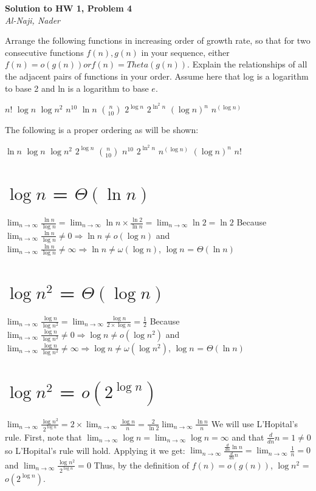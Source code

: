 \documentclass[12pt]{article}
\newcommand{\myhwtitle}[3]
{\begin{center}
{\large {\bf Solution to HW {#1}, Problem {#2}}}\\
\medskip 
{\it {#3}} %
\end{center}}
\begin{document}
\newpage
\myhwtitle{1}{4}{Al-Naji, Nader}

\bigskip

Arrange the following functions in increasing order of growth rate, so that for two consecutive functions $f(n), g(n)$ in your sequence, either $f(n) = o(g(n)) or f(n) = Theta(g(n)).$
Explain the relationships of all the adjacent pairs of functions in your order. Assume here that log is a logarithm to base 2 and ln is a logarithm to base $e$.
\begin{center}
\Large $n!$  $\log n$  $\log n^2$  $n^{10}$  $\ln n$  $n \choose 10$  $2^{\log n}$  $2^{\ln^2 n}$  $(\log n)^n$  $n^{(\log n)}$
\end{center}
The following is a proper ordering as will be shown:
\begin{center}
\Large $\ln n$ $\log n$ $\log n^2$ $2^{\log n}$ $n \choose 10$ $n^{10}$ $2^{\ln^2 n}$ $n^{(\log n)}$ $(\log n)^n$ $n!$
\end{center}
\section{$\log n$ = $\Theta(\ln n)$}
$\lim_{n\to\infty} \frac{\ln n}{\log n} = \lim_{n\to\infty} \ln n \times \frac{\ln 2}{\ln n} = \lim_{n\to\infty} \ln 2 = \ln 2$
\newline
Because $\lim_{n\to\infty} \frac{\ln n}{\log n} \neq 0 \Rightarrow \ln n \neq o(\log n)$
\newline
and $\lim_{n\to\infty} \frac{\ln n}{\log n} \neq \infty \Rightarrow \ln n \neq \omega(\log n)$,
\newline
$\log n$ = $\Theta(\ln n)$
\section{$\log n^2$ = $\Theta(\log n)$}
$\lim_{n\to\infty} \frac{\log n}{\log n^2} = \lim_{n\to\infty} \frac{\log n}{2 \times \log n} = \frac{1}{2}$
\newline
Because $\lim_{n\to\infty} \frac{\log n}{\log n^2} \neq 0 \Rightarrow \log n \neq o(\log n^2)$
\newline
and $\lim_{n\to\infty} \frac{\log n}{\log n^2} \neq \infty \Rightarrow \log n \neq \omega(\log n^2)$,
\newline
$\log n$ = $\Theta(\ln n)$
\section{$\log n^2$ = $o(2^{\log n})$}
$\lim_{n\to\infty} \frac{\log n^2}{2^{\log n}} = 2 \times \lim_{n\to\infty} \frac{\log n}{n} = \frac{2}{\ln 2} \lim_{n\to\infty} \frac{\ln n}{n}$
\newline
We will use L'Hopital's rule. First, note that $\lim_{n\to\infty} \log n = \lim_{n\to\infty} \log n  = \infty$
and that $\frac{d}{dn} n = 1 \neq 0$ so L'Hopital's rule will hold. Applying it we get:
\newline
$\lim_{n\to\infty} \frac{\frac{d}{dn}\ln n}{\frac{d}{dn}n} = \lim_{n\to\infty} \frac{1}{n} = 0$ and $\lim_{n\to\infty} \frac{\log n^2}{2^{\log n}} = 0$
\newline
Thus, by the definition of $f(n) = o(g(n))$, $\log n^2$ = $o(2^{\log n})$.
\newline
\end{document}
